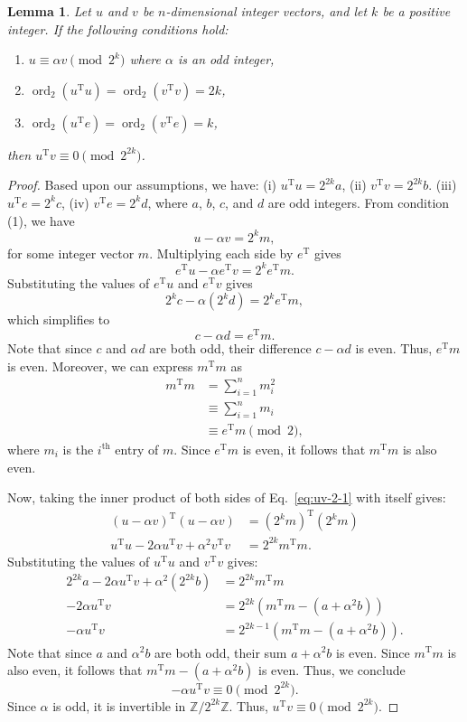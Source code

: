 \documentclass[12pt]{article}
\theoremstyle{plain}
\newtheorem{lemma}[theorem]{Lemma}
\theoremstyle{definition}
\newcommand{\trans}{^{\mathrm{T}}}
\begin{document}
\begin{lemma}
\label{lemma:uv-2}
Let $u$ and $v$ be $n$-dimensional integer vectors, and let $k$ be a positive integer. If the following conditions hold:
\begin{enumerate}
\item $u \equiv \alpha v \pmod{2^k}$ where $\alpha$ is an odd integer,
\item $\operatorname{ord}_2(u\trans u) = \operatorname{ord}_2(v\trans v) = 2k$,
\item $\operatorname{ord}_2(u\trans e) = \operatorname{ord}_2(v\trans e) = k$,
\end{enumerate}
then $u\trans v \equiv 0 \pmod{2^{2k}}$.
\end{lemma}

\begin{proof}
Based upon our assumptions, we have: (i) $u\trans u = 2^{2k} a$, (ii) $v\trans v = 2^{2k} b$. (iii) $u\trans e = 2^{k} c$, (iv) $v\trans e = 2^{k} d$, where $a$, $b$, $c$, and $d$ are odd integers. From condition (1), we have
\begin{equation}
\label{eq:uv-2-1}
u - \alpha v = 2^{k} m,
\end{equation}
for some integer vector $m$. Multiplying each side by $e\trans$ gives
$$e\trans u - \alpha e\trans v = 2^k e\trans m.$$
Substituting the values of $e\trans u$ and $e\trans v$ gives
$$2^k c - \alpha (2^k d) = 2^k e\trans m,$$
which simplifies to
$$c - \alpha d = e\trans m.$$
Note that since $c$ and $\alpha d$ are both odd, their difference $c - \alpha d$ is even. Thus, $e\trans m$ is even. Moreover, we can express $m\trans m$ as
\begin{align*}
m\trans m &= \sum_{i=1}^{n} m_i^2 \\
&\equiv \sum_{i=1}^{n} m_i \\
&\equiv e\trans m \pmod{2},
\end{align*}
where $m_i$ is the $i^\text{th}$ entry of $m$. Since $e\trans m$ is even, it follows that $m\trans m$ is also even. 

Now, taking the inner product of both sides of Eq.~\eqref{eq:uv-2-1} with itself gives:
\begin{align*}
(u - \alpha v)\trans (u - \alpha v) &= (2^{k} m)\trans (2^{k} m) \\
u\trans u - 2 \alpha u\trans v + \alpha^2 v\trans v &= 2^{2k} m\trans m.
\end{align*}
Substituting the values of $u\trans u$ and $v\trans v$ gives:
\begin{align*}
2^{2k} a - 2 \alpha u\trans v + \alpha^2 (2^{2k} b) &= 2^{2k} m\trans m \\
-2 \alpha u\trans v &= 2^{2k} (m\trans m - (a + \alpha^2 b)) \\
-\alpha u\trans v &= 2^{2k-1} (m\trans m - (a + \alpha^2 b)).
\end{align*}
Note that since $a$ and $\alpha^2 b$ are both odd, their sum $a + \alpha^2 b$ is even. Since $m\trans m$ is also even, it follows that $m\trans m - (a + \alpha^2 b)$ is even. Thus, we conclude
$$-\alpha u\trans v \equiv 0 \pmod{2^{2k}}.$$
Since $\alpha$ is odd, it is invertible in $\mathbb{Z}/2^{2k}\mathbb{Z}$. Thus, $u\trans v \equiv 0 \pmod{2^{2k}}$.
\end{proof}
\end{document}
